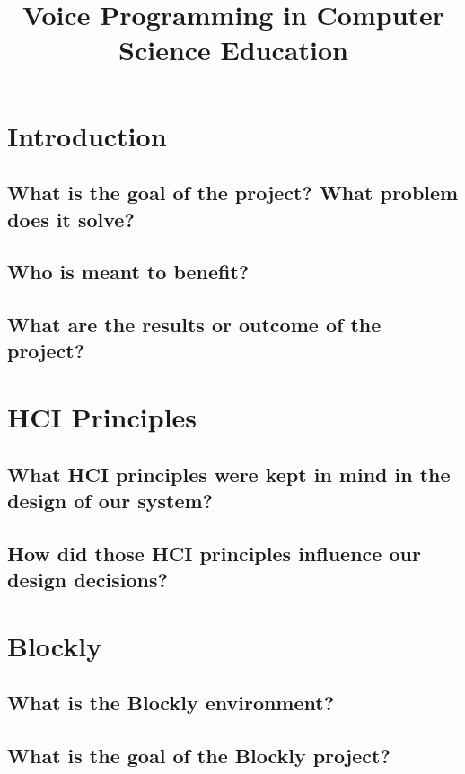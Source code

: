 \documentclass[]{article}
\title{Voice Programming in Computer Science Education}
\begin{document}
\maketitle

\section{Introduction}

\subsection{What is the goal of the project? What problem does it solve?}

\subsection{Who is meant to benefit?}

\subsection{What are the results or outcome of the project?}


\section{HCI Principles}

\subsection{What HCI principles were kept in mind in the design of our system?}

\subsection{How did those HCI principles influence our design decisions?}


\section{Blockly}

\subsection{What is the Blockly environment?}

\subsection{What is the goal of the Blockly project?}
\end{document}

